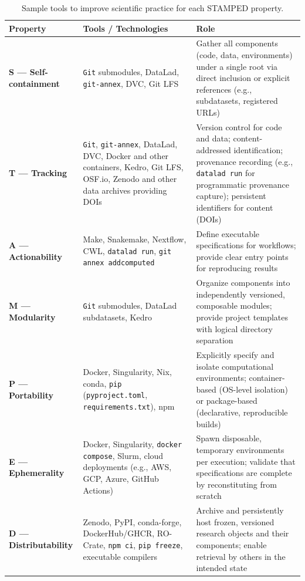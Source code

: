 \documentclass{article}
\begin{document}
\begin{table}[ht]
\centering
\caption{Sample tools to improve scientific practice for each STAMPED property.}
\label{tab:stamped-tools}
\begin{tabular}{|l|p{5cm}|p{6cm}|}
\hline
\textbf{Property} & \textbf{Tools / Technologies} & \textbf{Role} \\
\hline
\textbf{S — Self-containment} &
\texttt{Git} submodules, DataLad, \texttt{git-annex}, DVC, Git LFS &
Gather all components (code, data, environments) under a single root via direct inclusion or explicit references (e.g., subdatasets, registered URLs) \\
\hline
\textbf{T — Tracking} &
\texttt{Git}, \texttt{git-annex}, DataLad, DVC, Docker and other containers, Kedro, Git LFS, OSF.io, Zenodo and other data archives providing DOIs &
Version control for code and data; content-addressed identification; provenance recording (e.g., \texttt{datalad run} for programmatic provenance capture); persistent identifiers for content (DOIs) \\
\hline
\textbf{A — Actionability} &
Make, Snakemake, Nextflow, CWL, \texttt{datalad run}, \texttt{git annex addcomputed} &
Define executable specifications for workflows; provide clear entry points for reproducing results \\
\hline
\textbf{M — Modularity} &
\texttt{Git} submodules, DataLad subdatasets, Kedro &
Organize components into independently versioned, composable modules; provide project templates with logical directory separation \\
\hline
\textbf{P — Portability} &
Docker, Singularity, Nix, conda, \texttt{pip} (\texttt{pyproject.toml}, \texttt{requirements.txt}), npm &
Explicitly specify and isolate computational environments; container-based (OS-level isolation) or package-based (declarative, reproducible builds) \\
\hline
\textbf{E — Ephemerality} &
Docker, Singularity, \texttt{docker compose}, Slurm, cloud deployments (e.g., AWS, GCP, Azure, GitHub Actions) &
Spawn disposable, temporary environments per execution; validate that specifications are complete by reconstituting from scratch \\
\hline
\textbf{D — Distributability} &
Zenodo, PyPI, conda-forge, DockerHub/GHCR, RO-Crate, \texttt{npm ci}, \texttt{pip freeze}, executable compilers &
Archive and persistently host frozen, versioned research objects and their components; enable retrieval by others in the intended state \\
\hline
\end{tabular}
\end{table}
\end{document}
